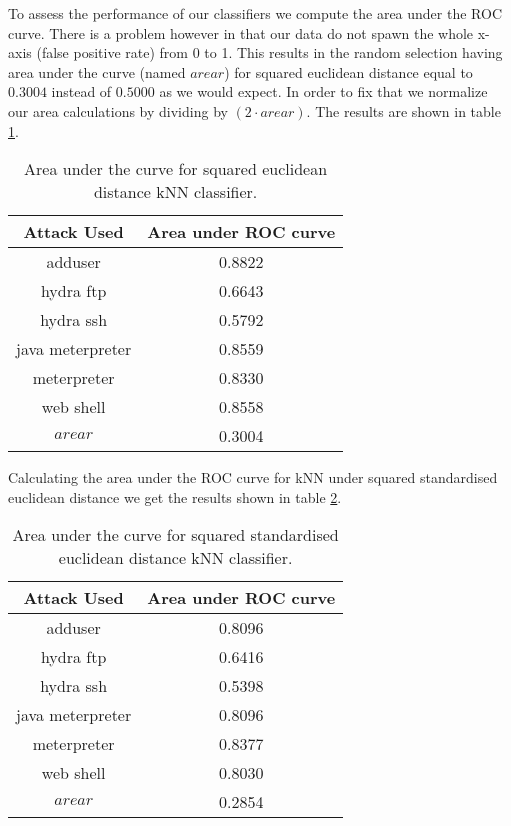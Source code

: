 \documentclass[reqno,openany,12pt]{amsbook}
\begin{document}
To assess the performance of our classifiers we compute the area under the ROC curve. There is a problem however in that our data do not spawn the whole x-axis (false positive rate) from 0 to 1. This results in the random selection having area under the curve (named $arear$) for squared euclidean distance equal to $0.3004$ instead of $0.5000$ as we would expect.
In order to fix that we normalize our area calculations by dividing by $(2\cdot arear)$. The results are shown in table \ref{knnt3}.
\begin{table}
\begin{tabular}{|c|c|}
\hline
Attack Used &  Area under ROC curve \\ \hline 
adduser          & 0.8822 \\ \hline
hydra ftp        & 0.6643 \\ \hline
hydra ssh        & 0.5792 \\ \hline
java meterpreter & 0.8559 \\ \hline
meterpreter      & 0.8330 \\ \hline
web shell        & 0.8558 \\ \hline
$arear$          & 0.3004 \\ \hline
\end{tabular}
\vspace{5pt}
\caption{Area under the curve for squared euclidean distance kNN classifier.}
\label{knnt3}
\end{table}

Calculating the area under the ROC curve for kNN under squared standardised euclidean distance we get the results shown in table \ref{knnt4}.

\begin{table}
\begin{tabular}{|c|c|}
\hline
Attack Used &  Area under ROC curve \\ \hline 
adduser          & 0.8096 \\ \hline
hydra ftp        & 0.6416 \\ \hline
hydra ssh        & 0.5398 \\ \hline
java meterpreter & 0.8096 \\ \hline
meterpreter      & 0.8377 \\ \hline
web shell        & 0.8030 \\ \hline
$arear$          & 0.2854 \\ \hline
\end{tabular}
\vspace{5pt}
\caption{Area under the curve for squared standardised euclidean distance kNN classifier.}
\label{knnt4}
\end{table}
\end{document}
